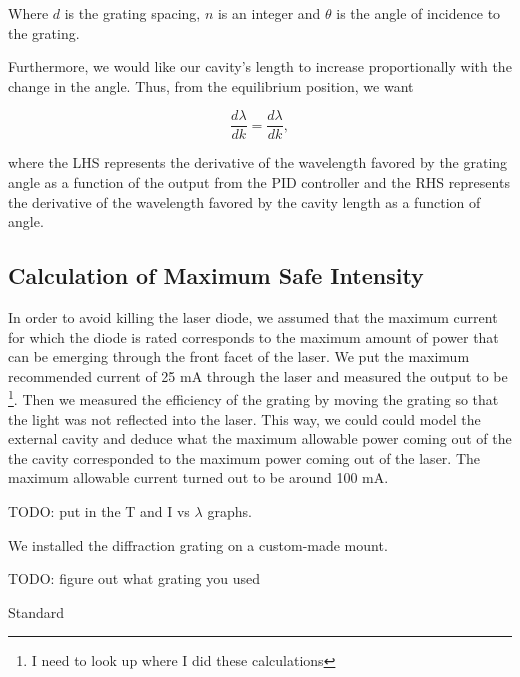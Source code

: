 Where $d$ is the grating spacing, $n$ is an integer and $\theta$ is the angle of incidence to the grating. 

Furthermore, we would like our cavity's length to increase proportionally with the change in the angle. Thus, from the equilibrium position, we want 

\begin{equation}
\frac{d \lambda}{d k} = \frac{d \lambda}{d k},
\end{equation}

where the LHS represents the derivative of the wavelength favored by the grating angle as a function of the output from the PID controller and the RHS represents the derivative of the wavelength favored by the cavity length as a function of angle. 



\subsection{Calculation of Maximum Safe Intensity}
In order to avoid killing the laser diode, we assumed that the maximum current for which the diode is rated corresponds to the maximum amount of power that can be emerging through the front facet of the laser. We put the maximum recommended current of 25 mA through the laser and measured the output to be \footnote{I need to look up where I did these calculations}. Then we measured the efficiency of the grating by moving the grating so that the light was not reflected into the laser. This way, we could could model the external cavity and deduce what the maximum allowable power coming out of the the cavity corresponded to the maximum power coming out of the laser. The maximum allowable current turned out to be around 100 mA. 

 
TODO: put in the T and I vs $\lambda$ graphs. 

We installed the diffraction grating on a custom-made mount. 

TODO: figure out what grating you used 

Standard 


